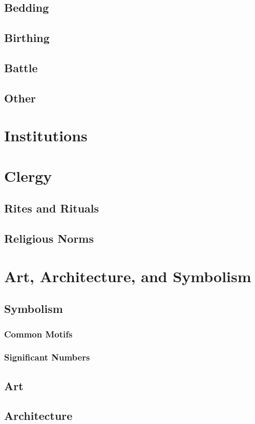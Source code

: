 \subsection{Bedding}
\subsection{Birthing}
\subsection{Battle}
\subsection{Other}

\section{Institutions}
\section{Clergy}
\subsection{Rites and Rituals}
\subsection{Religious Norms}

\section{Art, Architecture, and Symbolism}
\subsection{Symbolism}
\subsubsection{Common Motifs}
\subsubsection{Significant Numbers}
\subsection{Art}
\subsection{Architecture}

